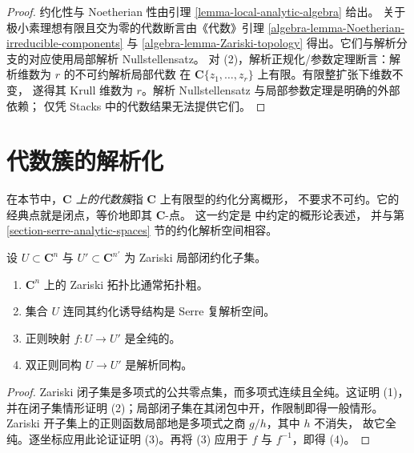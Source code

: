 \begin{proof}
约化性与 Noetherian 性由引理 \ref{lemma-local-analytic-algebra} 给出。
关于极小素理想有限且交为零的代数断言由《代数》引理
\ref{algebra-lemma-Noetherian-irreducible-components} 与
\ref{algebra-lemma-Zariski-topology} 得出。它们与解析分支的对应使用局部解析 Nullstellensatz。
对 (2)，解析正规化/参数定理断言：解析维数为 $r$ 的不可约解析局部代数
在 $\mathbf C\{z_1,\ldots,z_r\}$ 上有限。有限整扩张下维数不变，
遂得其 Krull 维数为 $r$。解析 Nullstellensatz 与局部参数定理是明确的外部依赖；
仅凭 Stacks 中的代数结果无法提供它们。
\end{proof}




%

\section{代数簇的解析化}
\label{section-analytification}

\noindent
在本节中，{\it $\mathbf C$ 上的代数簇}指 $\mathbf C$ 上有限型的约化分离概形，
不要求不可约。它的经典点就是闭点，等价地即其 $\mathbf C$-点。
这一约定是 \cite[\S 2，第 5 号]{GAGA} 中约定的概形论表述，
并与第 \ref{section-serre-analytic-spaces} 节的约化解析空间相容。

\begin{lemma}
\label{lemma-algebraic-charts-analytic}
设 $U \subset \mathbf C^n$ 与 $U' \subset \mathbf C^{n'}$ 为 Zariski 局部闭约化子集。
\begin{enumerate}
\item $\mathbf C^n$ 上的 Zariski 拓扑比通常拓扑粗。
\item 集合 $U$ 连同其约化诱导结构是 Serre 复解析空间。
\item 正则映射 $f : U \to U'$ 是全纯的。
\item 双正则同构 $U \to U'$ 是解析同构。
\end{enumerate}
\end{lemma}

\begin{proof}
Zariski 闭子集是多项式的公共零点集，而多项式连续且全纯。这证明 (1)，
并在闭子集情形证明 (2)；局部闭子集在其闭包中开，作限制即得一般情形。
Zariski 开子集上的正则函数局部地是多项式之商 $g/h$，其中 $h$ 不消失，
故它全纯。逐坐标应用此论证证明 (3)。再将 (3) 应用于 $f$ 与 $f^{-1}$，即得 (4)。
\end{proof}

